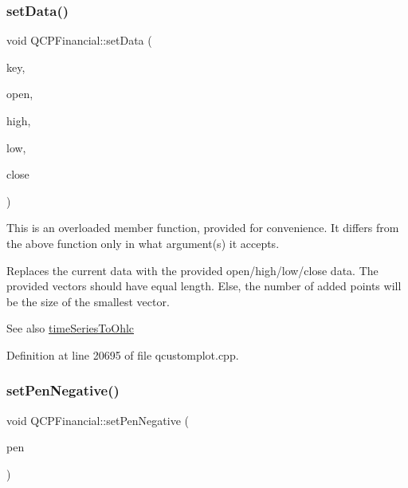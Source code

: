 \subsubsection{\texorpdfstring{set\+Data()}{setData()}\hspace{0.1cm}{\footnotesize\ttfamily [2/2]}}
{\footnotesize\ttfamily void Q\+C\+P\+Financial\+::set\+Data (\begin{DoxyParamCaption}\item[{const Q\+Vector$<$ double $>$ \&}]{key,  }\item[{const Q\+Vector$<$ double $>$ \&}]{open,  }\item[{const Q\+Vector$<$ double $>$ \&}]{high,  }\item[{const Q\+Vector$<$ double $>$ \&}]{low,  }\item[{const Q\+Vector$<$ double $>$ \&}]{close }\end{DoxyParamCaption})}

This is an overloaded member function, provided for convenience. It differs from the above function only in what argument(s) it accepts.

Replaces the current data with the provided open/high/low/close data. The provided vectors should have equal length. Else, the number of added points will be the size of the smallest vector.

\begin{DoxySeeAlso}{See also}
\hyperlink{class_q_c_p_financial_a0c3453d1c03e320950fdd2df54e3ebc8}{time\+Series\+To\+Ohlc} 
\end{DoxySeeAlso}


Definition at line 20695 of file qcustomplot.\+cpp.

\mbox{\label{class_q_c_p_financial_afe5c07e94ccea01a75b3a2476993c346}} 
\subsubsection{\texorpdfstring{set\+Pen\+Negative()}{setPenNegative()}}
{\footnotesize\ttfamily void Q\+C\+P\+Financial\+::set\+Pen\+Negative (\begin{DoxyParamCaption}\item[{const Q\+Pen \&}]{pen }\end{DoxyParamCaption})}

